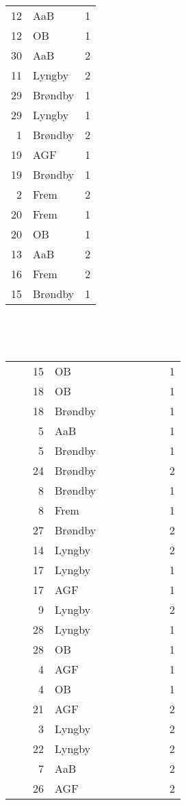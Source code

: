 \documentclass{article}
\begin{document}
{\begin{center}
\begin{small}
{\begin{tabular}{|r|l|r|}
12 & AaB      &      1 \\ 
12 & OB       &      1 \\ 
30 & AaB      &      2 \\ 
11 & Lyngby   &      2 \\ 
29 & Br\o{}ndby &      1 \\ 
29 & Lyngby   &      1 \\ 
 1 & Br\o{}ndby &      2 \\ 
19 & AGF      &      1 \\ 
19 & Br\o{}ndby &      1 \\ 
 2 & Frem     &      2 \\ 
20 & Frem     &      1 \\ 
20 & OB       &      1 \\ 
13 & AaB      &      2 \\ 
16 & Frem     &      2 \\ 
15 & Br\o{}ndby &      1
\end{tabular}
}
~~~~~~~
{\tt
\begin{tabular}{|r|l|r|}
~~~~15 & OB~~~~~~~       &      ~~~~~~~~~1 \\ 
18 & OB       &      1 \\ 
18 & Br\o{}ndby &      1 \\ 
 5 & AaB      &      1 \\ 
 5 & Br\o{}ndby &      1 \\ 
24 & Br\o{}ndby &      2 \\ 
 8 & Br\o{}ndby &      1 \\ 
 8 & Frem     &      1 \\ 
27 & Br\o{}ndby &      2 \\ 
14 & Lyngby   &      2 \\ 
17 & Lyngby   &      1 \\ 
17 & AGF      &      1 \\ 
 9 & Lyngby   &      2 \\ 
28 & Lyngby   &      1 \\ 
28 & OB       &      1 \\ 
 4 & AGF      &      1 \\ 
 4 & OB       &      1 \\ 
21 & AGF      &      2 \\ 
 3 & Lyngby   &      2 \\ 
22 & Lyngby   &      2 \\ 
 7 & AaB      &      2 \\ 
26 & AGF      &      2 \\\hline
\end{tabular}
}
\end{small}
\end{center}
}
\end{document}
